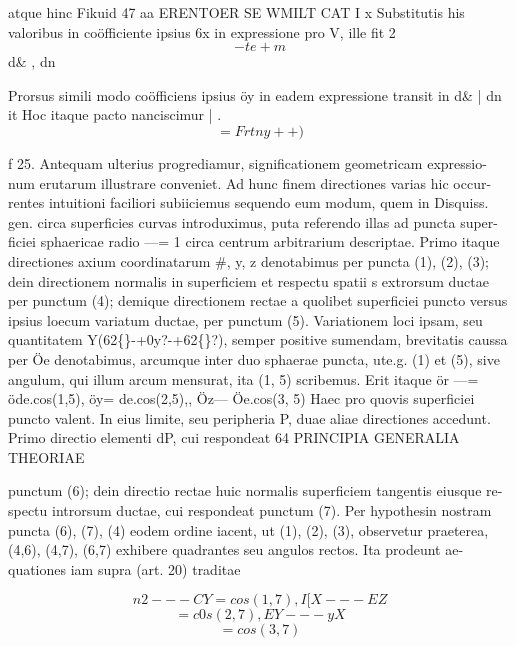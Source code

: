 \documentclass[12pt,a4paper]{article}
\begin{document}
atque hinc
Fikuid             47                               aa
ERENTOER
SE          WMILT          CAT                      I x
Substitutis his valoribus in coöfficiente ipsius 6x in expressione pro                   V, ille fit
2
\[                                           -te+m\]
d\& , dn

Prorsus simili modo coöfficiens ipsius öy in eadem expressione transit in
d\& | dn
it
Hoc itaque pacto nanciscimur
|                                                     .
\[                             =       Fr      tny           ++)\]


f                             25.
Antequam ulterius progrediamur, significationem geometricam expressio-
num erutarum illustrare conveniet.      Ad hunc finem directiones varias hic occur-
rentes intuitioni faciliori subiiciemus sequendo eum modum, quem in Disquiss.
gen. circa superficies curvas introduximus, puta referendo illas ad puncta super-
ficiei sphaericae radio ---= 1 circa centrum arbitrarium descriptae.    Primo itaque
directiones axium coordinatarum \#, y, z denotabimus per puncta (1), (2), (3);
dein directionem normalis in superficiem et respectu spatii s extrorsum ductae per
punctum (4); demique directionem rectae a quolibet superficiei puncto versus
ipsius loecum variatum ductae, per punctum (5). Variationem loci ipsam, seu
quantitatem Y(62\textdegree\{\}-+0y?-+62\textdegree\{\}?),               semper positive sumendam, brevitatis caussa
per Öe denotabimus, arcumque inter duo sphaerae puncta, ute.g. (1) et (5),
sive angulum, qui illum arcum mensurat, ita (1, 5) scribemus. Erit itaque
ör ---= öde.cos(1,5),            öy= de.cos(2,5),,                Öz--- Öe.cos(3, 5)
Haec pro quovis superficiei puncto valent. In eius limite, seu peripheria P,
duae aliae directiones accedunt.   Primo directio elementi dP, cui respondeat
64                                PRINCIPIA GENERALIA THEORIAE

punctum (6); dein directio rectae huic normalis superficiem tangentis eiusque re-
spectu introrsum ductae, cui respondeat punctum (7). Per hypothesin nostram
puncta (6), (7), (4) eodem ordine iacent, ut (1), (2), (3), observetur praeterea,
(4,6), (4,7), (6,7) exhibere quadrantes seu angulos rectos.     Ita prodeunt ae-
quationes iam supra (art. 20) traditae

\[     n2---CY= cos(1,7),                   I[X---EZ\]
\[                                           = c0s(2,7),                           EY---yX\]
\[                                                                                    = cos(3,7)\]
\end{document}
